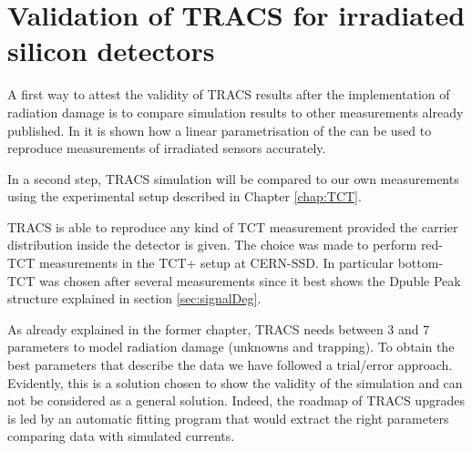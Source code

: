 \clearpage
{}  %
\chapter{Validation of TRACS for irradiated silicon detectors}
\label{chap:TRACSvalidity}

A first way to attest the validity of TRACS results after the implementation of radiation damage is to compare simulation results to other measurements already published. In \cite{Pholsen} it is shown how a linear parametrisation of the \neff can be used to reproduce measurements of irradiated sensors accurately.

In a second step, TRACS simulation will be compared to our own measurements using the experimental setup described in Chapter \ref{chap:TCT}.


TRACS is able to reproduce any kind of TCT measurement provided the carrier distribution inside the detector is given. The choice was made to perform red-TCT measurements in the TCT+ setup at CERN-SSD\cite{ssd}. In particular bottom-TCT was chosen after several measurements since it best shows the Dpuble Peak structure explained in section \ref{sec:signalDeg}. 

As already explained in the former chapter, TRACS needs between 3 and 7 parameters to model radiation damage (\neff unknowns and trapping). To obtain the best parameters that describe the data we have followed a trial/error approach. Evidently, this is a solution chosen to show the validity of the simulation and can not be considered as a general solution. Indeed, the roadmap of TRACS upgrades is led by an automatic fitting program that would extract the right parameters comparing data with simulated currents.

